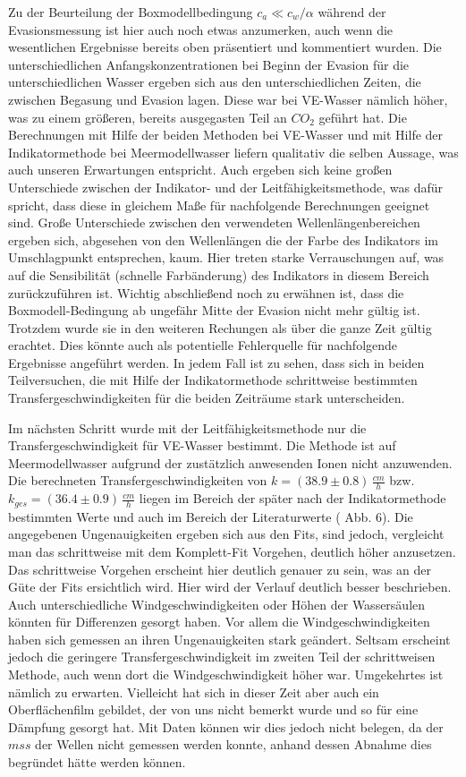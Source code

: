 \documentclass[12pt]{article}
\begin{document}
Zu der Beurteilung der Boxmodellbedingung $c_a \ll c_w/\alpha $ während der Evasionsmessung ist hier auch noch etwas anzumerken, auch wenn die wesentlichen Ergebnisse bereits oben präsentiert und kommentiert wurden. Die unterschiedlichen Anfangskonzentrationen bei Beginn der Evasion für die unterschiedlichen Wasser ergeben sich aus den unterschiedlichen Zeiten, die zwischen Begasung und Evasion lagen. Diese war bei VE-Wasser nämlich höher, was zu einem größeren, bereits ausgegasten Teil an $CO_2$ geführt hat. Die Berechnungen mit Hilfe der beiden Methoden bei VE-Wasser und mit Hilfe der Indikatormethode bei Meermodellwasser liefern qualitativ die selben Aussage, was auch unseren Erwartungen entspricht. Auch ergeben sich keine großen Unterschiede zwischen der Indikator- und der Leitfähigkeitsmethode, was dafür spricht, dass diese in gleichem Maße für nachfolgende Berechnungen geeignet sind. Große Unterschiede zwischen den verwendeten Wellenlängenbereichen ergeben sich, abgesehen von den Wellenlängen die der Farbe des Indikators im Umschlagpunkt entsprechen, kaum. Hier treten starke Verrauschungen auf, was auf die Sensibilität (schnelle Farbänderung) des Indikators in diesem Bereich zurückzuführen ist. Wichtig abschließend noch zu erwähnen ist, dass die Boxmodell-Bedingung ab ungefähr Mitte der Evasion nicht mehr gültig ist. Trotzdem wurde sie in den weiteren Rechungen als über die ganze Zeit gültig erachtet. Dies könnte auch als potentielle Fehlerquelle für nachfolgende Ergebnisse angeführt werden. In jedem Fall ist zu sehen, dass sich in beiden Teilversuchen, die mit Hilfe der Indikatormethode schrittweise bestimmten Transfergeschwindigkeiten für die beiden Zeiträume stark unterscheiden.

Im nächsten Schritt wurde mit der Leitfähigkeitsmethode nur die Transfergeschwindigkeit für VE-Wasser bestimmt. Die Methode ist auf Meermodellwasser aufgrund der zustätzlich anwesenden Ionen nicht anzuwenden. Die berechneten Transfergeschwindigkeiten von $k = (38.9 \pm 0.8)\, \frac{cm}{h}$ bzw. $k_{ges} = (36.4 \pm 0.9)\, \frac{cm}{h}$ liegen im Bereich der später nach der Indikatormethode bestimmten Werte und auch im Bereich der Literaturwerte (\cite{jaehne} Abb. 6). Die angegebenen Ungenauigkeiten ergeben sich aus den Fits, sind jedoch, vergleicht man das schrittweise mit dem Komplett-Fit Vorgehen, deutlich höher anzusetzen. Das schrittweise Vorgehen erscheint hier deutlich genauer zu sein, was an der Güte der Fits ersichtlich wird. Hier wird der Verlauf deutlich besser beschrieben. Auch unterschiedliche Windgeschwindigkeiten oder Höhen der Wassersäulen könnten für Differenzen gesorgt haben. Vor allem die Windgeschwindigkeiten haben sich gemessen an ihren Ungenauigkeiten stark geändert. Seltsam erscheint jedoch die geringere Transfergeschwindigkeit im zweiten Teil der schrittweisen Methode, auch wenn dort die Windgeschwindigkeit höher war. Umgekehrtes ist nämlich zu erwarten. Vielleicht hat sich in dieser Zeit aber auch ein Oberflächenfilm gebildet, der von uns nicht bemerkt wurde und so für eine Dämpfung gesorgt hat. Mit Daten können wir dies jedoch nicht belegen, da der $mss$ der Wellen nicht gemessen werden konnte, anhand dessen Abnahme dies begründet hätte werden können.
\end{document}
